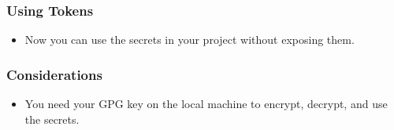 \documentclass[aspectratio=169]{beamer}
\begin{document}
{
    \begin{frame}
	   \frametitle{Using Tokens}
	\begin{itemize}
		\item Now you can use the secrets in your project without exposing them.
	\end{itemize}
    \end{frame}
}

{
    \begin{frame}
	   \frametitle{Considerations}
	\begin{itemize}
		\item You need your GPG key on the local machine to encrypt, decrypt, and use the secrets.
	\end{itemize}
    \end{frame}
}
\end{document}
